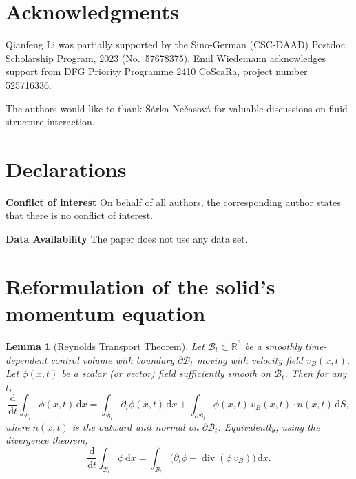\documentclass[11pt,twoside,reqno]{amsart}
\numberwithin{equation}{section}
\numberwithin{figure}{section}
\newtheorem{lemma}{Lemma}[section]
\begin{document}
 \medskip
 
 \section*{Acknowledgments}
 Qianfeng Li was partially supported by the Sino-German (CSC-DAAD) Postdoc Scholarship Program, 2023 (No.~57678375). Emil Wiedemann acknowledges support from DFG Priority Programme 2410 CoScaRa, project number 525716336.

 The authors would like to thank \v{S}\'arka Ne\v{c}asov\'a for valuable discussions on fluid-structure interaction.

 \section*{Declarations}
\noindent\textbf{Conflict of interest} 
On behalf of all authors, the corresponding author states that there is no conflict of interest.

\noindent\textbf{Data Availability} The paper does not use any data set.


\medskip
\appendix
\section{Reformulation of the solid's momentum equation}\label{App:WeakformofSolid}

\begin{lemma}[Reynolds Transport Theorem]\label{lem:reynolds}
Let $\mathcal{B}_t\subset\mathbb R^3$ be a smoothly time-dependent control volume with 
boundary $\partial\mathcal{B}_t$ moving with velocity field $v_B(x,t)$.
Let $\phi(x,t)$ be a scalar (or vector) field sufficiently smooth on $\mathcal{B}_t$.
Then for any $t$,
\begin{equation}\label{eq:reynolds}
\frac{\mathrm{d}}{\mathrm{d}t}\int_{\mathcal{B}_t}\phi(x,t)\,\mathrm{d}x
=
\int_{\mathcal{B}_t}\partial_t\phi(x,t)\,\mathrm{d}x
+\int_{\partial\mathcal{B}_t}\phi(x,t)\,v_B(x,t)\cdot n(x,t)\,\mathrm{d}S,
\end{equation}
where $n(x,t)$ is the outward unit normal on $\partial\mathcal{B}_t$.
Equivalently, using the divergence theorem,
\begin{equation}\label{eq:reynolds-div}
\frac{\mathrm{d}}{\mathrm{d}t}\int_{\mathcal{B}_t}\phi\,\mathrm{d}x
=
\int_{\mathcal{B}_t}\Big(\partial_t\phi+\operatorname{div}(\phi\,v_B)\Big)\,\mathrm{d}x.
\end{equation}
\end{lemma}
\end{document}
